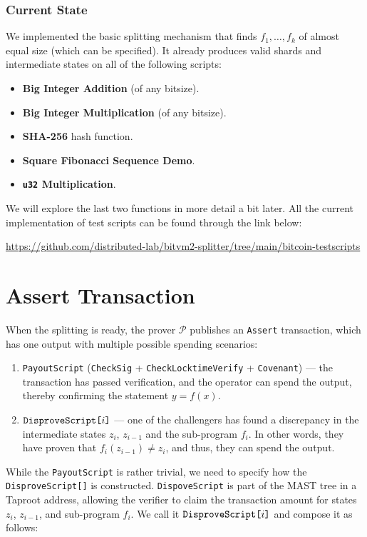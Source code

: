 \documentclass{iacrtrans}
\begin{document}
\subsubsection{Current State}
We implemented the basic splitting mechanism that finds $f_1,\dots,f_k$ of almost equal size (which can be specified). It already produces valid shards and intermediate states on all of the following scripts:
\begin{itemize}
    \item \textbf{Big Integer Addition} (of any bitsize).
    \item \textbf{Big Integer Multiplication} (of any bitsize).
    \item \textbf{SHA-256} hash function.
    \item \textbf{Square Fibonacci Sequence Demo}.
    \item \textbf{\texttt{u32} Multiplication}.
\end{itemize}

We will explore the last two functions in more detail a bit later. All the current implementation of test scripts can be found through the link below:
\begin{center}
  \url{https://github.com/distributed-lab/bitvm2-splitter/tree/main/bitcoin-testscripts}
\end{center}


\section{Assert Transaction}\label{sec:assert-tx}
When the splitting is ready, the prover $\mathcal{P}$ publishes an \texttt{Assert} transaction,
which has one output with multiple possible spending scenarios:

\begin{enumerate}
  \item \texttt{PayoutScript} (\texttt{CheckSig} + \texttt{CheckLocktimeVerify} + \texttt{Covenant}) --- the transaction has passed verification, and the operator can spend the output, thereby confirming the statement $y=f(x)$.
  \item $\texttt{DisproveScript[\text{$i$}]}$ --- one of the challengers has found a discrepancy in the intermediate states \(z_i\), \(z_{i-1}\) and the sub-program \(f_i\). In other words, they have proven that \(f_i(z_{i-1}) \neq z_i\), and thus, they can spend the output.
\end{enumerate}

While the \texttt{PayoutScript} is rather trivial, we need to specify how the \texttt{DisproveScript[]} is constructed. \texttt{DispoveScript} is part of the MAST tree in a Taproot address, allowing the verifier to claim the transaction amount for states
\(z_i\), \(z_{i-1}\), and sub-program \(f_i\). We call it
\(\texttt{DisproveScript[\text{$i$}]}\) and compose it as follows:
\end{document}
